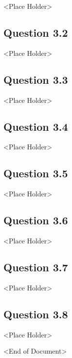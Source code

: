 \documentclass[parskip=full]{scrartcl}
\begin{document}
    <Place Holder>

    \subsection*{Question 3.2}
    
    <Place Holder>

    \subsection*{Question 3.3}
    
    <Place Holder>

    \subsection*{Question 3.4}
    
    <Place Holder>

    \subsection*{Question 3.5}
    
    <Place Holder>

    \subsection*{Question 3.6}
    
    <Place Holder>

    \subsection*{Question 3.7}
    
    <Place Holder>

    \subsection*{Question 3.8}
    
    <Place Holder>

    \begin{center}
        <End of Document>
    \end{center}
\end{document}
